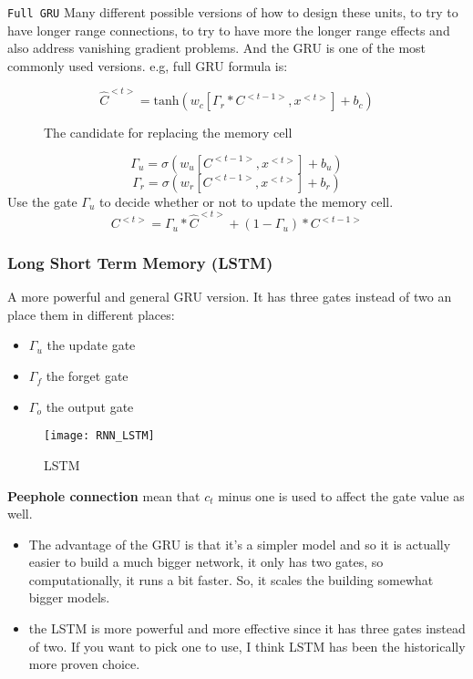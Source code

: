 \texttt{Full GRU}
Many different possible versions of how to design these units, to try to have longer range connections, to try to have more the longer range effects and also address vanishing gradient problems. And the GRU is one of the most commonly used versions. e.g, full GRU formula is:




\begin{figure}[!ht]
  \begin{equation}
    \hat{C}^{<t>} = \text{tanh}(w_c[\Gamma_r * C^{<t-1>}, x^{<t>}] + b_c)
  \end{equation}
\caption{The candidate for replacing the memory cell}
\end{figure}

\begin{equation*}
  \Gamma_u = \sigma (w_u[C^{<t-1>}, x^{<t>}] + b_u)
\end{equation*}
\begin{equation*}
  \Gamma_r = \sigma (w_r[C^{<t-1>}, x^{<t>}] + b_r)
\end{equation*}
Use the gate $\Gamma_u$ to decide whether or not to update the memory cell.
\begin{equation*}
C^{<t>} = \Gamma_u * \hat{C}^{<t>} + (1 - \Gamma_u) * C^{<t-1>}
\end{equation*}

\subsubsection{Long Short Term Memory (LSTM)}
A more powerful and general GRU version. It has three gates instead of two an place them in different places:
\begin{itemize}
    \item $\Gamma_u$ the update gate
    \item $\Gamma_f$ the forget gate
    \item $\Gamma_o$ the output gate
\end{itemize}

\begin{figure}[H]
\centering
\texttt{[image: RNN\_LSTM]}
\caption{LSTM}
\end{figure}
\textbf{Peephole connection} mean that $c_t$ minus one is used to affect the gate value as well.

\begin{itemize}
    \item The advantage of the GRU is that it's a simpler model and so it is actually easier to build a much bigger network, it only has two gates, so computationally, it runs a bit faster. So, it scales the building somewhat bigger models. 
    \item the LSTM is more powerful and more effective since it has three gates instead of two. If you want to pick one to use, I think LSTM has been the historically more proven choice. 
\end{itemize}

